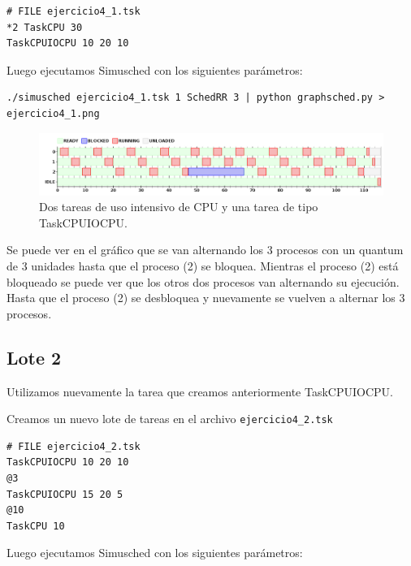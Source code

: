 \begin{framed}
\begin{verbatim}
# FILE ejercicio4_1.tsk
*2 TaskCPU 30
TaskCPUIOCPU 10 20 10
\end{verbatim}
\end{framed}

Luego ejecutamos Simusched con los siguientes par\'ametros:

\begin{framed}
\begin{verbatim}
./simusched ejercicio4_1.tsk 1 SchedRR 3 | python graphsched.py > ejercicio4_1.png
\end{verbatim}
\end{framed}

\begin{figure}[H]
  \centering
    \includegraphics[width=1\textwidth]{img/ejercicio4_1.png}
    \caption{Dos tareas de uso intensivo de CPU y una tarea de tipo TaskCPUIOCPU.}
\end{figure}

Se puede ver en el gr\'afico que se van alternando los 3 procesos con un quantum de 3 unidades hasta que el proceso (2) se bloquea. Mientras el proceso (2) est\'a bloqueado se puede ver que los otros dos procesos van alternando su ejecuci\'on. Hasta que el proceso (2) se desbloquea y nuevamente se vuelven a alternar los 3 procesos.

\subsection{Lote 2}

Utilizamos nuevamente la tarea que creamos anteriormente TaskCPUIOCPU.

Creamos un nuevo lote de tareas en el archivo \verb|ejercicio4_2.tsk|

\begin{framed}
\begin{verbatim}
# FILE ejercicio4_2.tsk
TaskCPUIOCPU 10 20 10
@3
TaskCPUIOCPU 15 20 5
@10
TaskCPU 10
\end{verbatim}
\end{framed}

Luego ejecutamos Simusched con los siguientes par\'ametros:

